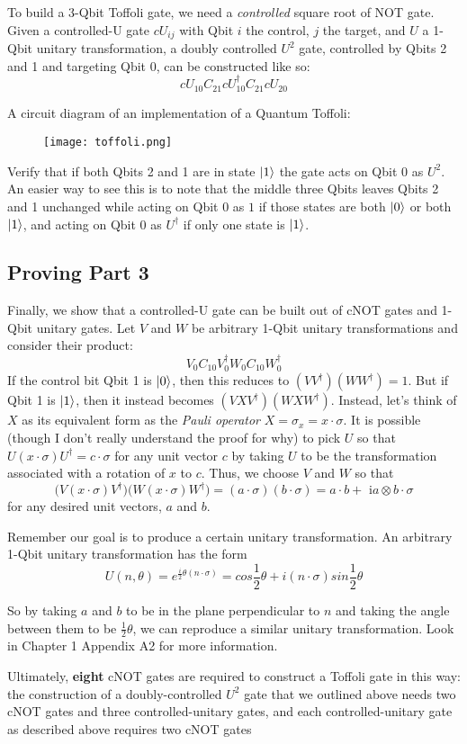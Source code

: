 \documentclass[letterpaper]{article}
\begin{document}
To build a 3-Qbit Toffoli gate, we need a \textsl{controlled} square root of NOT gate. Given a controlled-U gate $cU_{ij}$ with Qbit $i$ the control, $j$ the target, and $U$ a 1-Qbit unitary transformation, a doubly controlled $U^{2}$ gate, controlled by Qbits 2 and 1 and targeting Qbit 0, can be constructed like so: 
$$ cU_{10}C_{21}cU_{10}^{\dagger}C_{21}cU_{20}$$

A circuit diagram of an implementation of a Quantum Toffoli:
\begin{figure}[h!]
	\centering
	\texttt{[image: toffoli.png]}
\end{figure}

Verify that if both Qbits 2 and 1 are in state $\ket{1}$ the gate acts on Qbit 0 as $U^{2}$. An easier way to see this is to note that the middle three Qbits leaves Qbits 2 and 1 unchanged while acting on Qbit 0 as $1$ if those states are both $\ket{0}$ or both $\ket{1}$, and acting on Qbit 0 as $U^{\dagger}$ if only one state is $\ket{1}$. 

\subsection{Proving Part 3}
Finally, we show that a controlled-U gate can be built out of cNOT gates and 1-Qbit unitary gates. Let $V$ and $W$ be arbitrary 1-Qbit unitary transformations and consider their product: 
$$V_{0}C_{10}V_{0}^{\dagger}W_{0}C_{10}W_{0}^{\dagger}$$
If the control bit Qbit 1 is $\ket{0}$, then this reduces to $(VV^{\dagger})(WW^{\dagger}) = 1$. But if Qbit 1 is $\ket{1}$, then it instead becomes $(VXV^{\dagger})(WXW^{\dagger})$. Instead, let's think of $X$ as its equivalent form as the \textsl{Pauli operator} $X = \sigma_{x} = x \cdot \sigma $. It is possible (though I don't really understand the proof for why) to pick $U$ so that $U(x \cdot \sigma)U^{\dagger} = c \cdot \sigma$ for any unit vector $c$ by taking $U$ to be the transformation associated with a rotation of $x$ to $c$. Thus, we choose $V$ and $W$ so that 
$$\Big( V(x \cdot \sigma)V^{\dagger} \Big) \Big( W(x \cdot \sigma)W^{\dagger} \Big) = (a \cdot \sigma)(b \cdot \sigma) = a \cdot b + \text{ i}a \otimes b \cdot \sigma$$
for any desired unit vectors, $a$ and $b$. 

Remember our goal is to produce a certain unitary transformation. An arbitrary 1-Qbit unitary transformation has the form 
$$U(n, \theta) = e^{\frac{i}{2} \theta(n \cdot \sigma)} = cos \frac{1}{2} \theta + i(n \cdot \sigma) sin \frac{1}{2} \theta $$

So by taking $a$ and $b$ to be in the plane perpendicular to $n$ and taking the angle between them to be $\frac{1}{2}\theta$, we can reproduce a similar unitary transformation. Look in Chapter 1 Appendix A2 for more information. 

Ultimately, \textbf{eight} cNOT gates are required to construct a Toffoli gate in this way: the construction of a doubly-controlled $U^{2}$ gate that we outlined above needs two cNOT gates and three controlled-unitary gates, and each controlled-unitary gate as described above requires two cNOT gates
\end{document}
